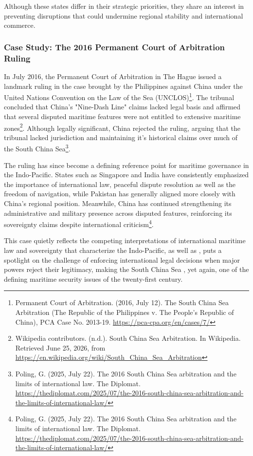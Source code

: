 Although these states differ in their strategic priorities, they share an interest in preventing disruptions that could undermine regional stability and international commerce.

\subsubsection{Case Study: The 2016 Permanent Court of Arbitration Ruling}

In July 2016, the Permanent Court of Arbitration in The Hague issued a landmark ruling in the case brought by the Philippines against China under the United Nations Convention on the Law of the Sea (UNCLOS)\footnote{Permanent Court of Arbitration. (2016, July 12). The South China Sea Arbitration (The Republic of the Philippines v. The People's Republic of China), PCA Case No. 2013-19. \url{https://pca-cpa.org/en/cases/7/}}. The tribunal concluded that China's "Nine-Dash Line" claims lacked legal basis and affirmed that several disputed maritime features were not entitled to extensive maritime zones\footnote{Wikipedia contributors. (n.d.). South China Sea Arbitration. In Wikipedia. Retrieved June 25, 2026, from \url{https://en.wikipedia.org/wiki/South_China_Sea_Arbitration}}. Although legally significant, China rejected the ruling, arguing that the tribunal lacked jurisdiction and maintaining it’s historical claims over much of the South China Sea\footnote{Poling, G. (2025, July 22). The 2016 South China Sea arbitration and the limits of international law. The Diplomat. \url{https://thediplomat.com/2025/07/the-2016-south-china-sea-arbitration-and-the-limits-of-international-law/}}.

The ruling has since become a defining reference point for maritime governance in the Indo-Pacific. States such as Singapore and India have consistently emphasized the importance of international law, peaceful dispute resolution as well as the freedom of navigation, while Pakistan has generally aligned more closely with China's regional position. Meanwhile, China has continued strengthening its administrative and military presence across disputed features, reinforcing its sovereignty claims despite international criticism\footnote{Poling, G. (2025, July 22). The 2016 South China Sea arbitration and the limits of international law. The Diplomat. \url{https://thediplomat.com/2025/07/the-2016-south-china-sea-arbitration-and-the-limits-of-international-law/}}.

This case quietly reflects the competing interpretations of international maritime law and sovereignty that characterize the Indo-Pacific, as well as , puts a spotlight on the challenge of enforcing international legal decisions when major powers reject their legitimacy, making the South China Sea , yet again, one of the defining maritime security issues of the twenty-first century.

